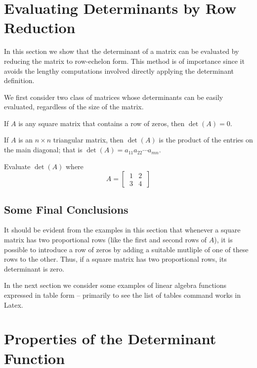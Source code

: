 \section{Evaluating Determinants by Row Reduction}

In this section we show that the determinant of a matrix can be
evaluated by reducing the matrix to row-echelon form.  This method is of
importance since it avoids the lengthy computations involved directly
applying the determinant definition.

We first consider two class of matrices whose determinants can be easily
evaluated, regardless of the size of the matrix.

\begin{theorem}
If $A$ is any square matrix that contains a row of zeros, then
$\det(A)=0$.
\end{theorem}

\begin{theorem}
If $A$ is an $n\times n$ triangular matrix, then $\det(A)$ is the
product of the entries on the main diagonal; that is $\det(A)=
a_{11}a_{22} \cdots a_{mn}$.
\end{theorem}

\begin{example}
Evaluate $\det(A)$ where
\begin{equation}
  A =  \left[ \  \begin{matrix} 1 & 2 \\ 3 & 4 \end{matrix}
		\ \right]
\end{equation}
\end{example}


\subsection{Some Final Conclusions}

It should be evident from the examples in this section that whenever a
square matrix has two proportional rows (like the first and second rows
of $A$), it is possible to introduce a row of zeros by adding a suitable
mutliple of one of these rows to the other.  Thus, if a square matrix
has two proportional rows, its determinant is zero.

In the next section we consider some examples of linear algebra
functions expressed in table form -- primarily to see the list of tables
command works in Latex.


\section{Properties of the Determinant Function}

